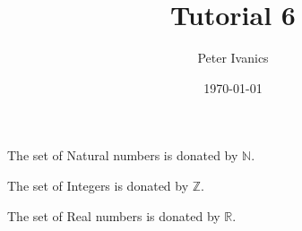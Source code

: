 \documentclass[11]{article}
\begin{document}
	\tableofcontents

	\title{Tutorial 6}
	\author{Peter Ivanics}
	\date{\today}
	\maketitle
	
	The set of Natural numbers is donated by $\mathbb{N}$.
	
	The set of Integers is donated by $\mathbb{Z}$.
	
	The set of Real numbers is donated by $\mathbb{R}$.
\end{document}

